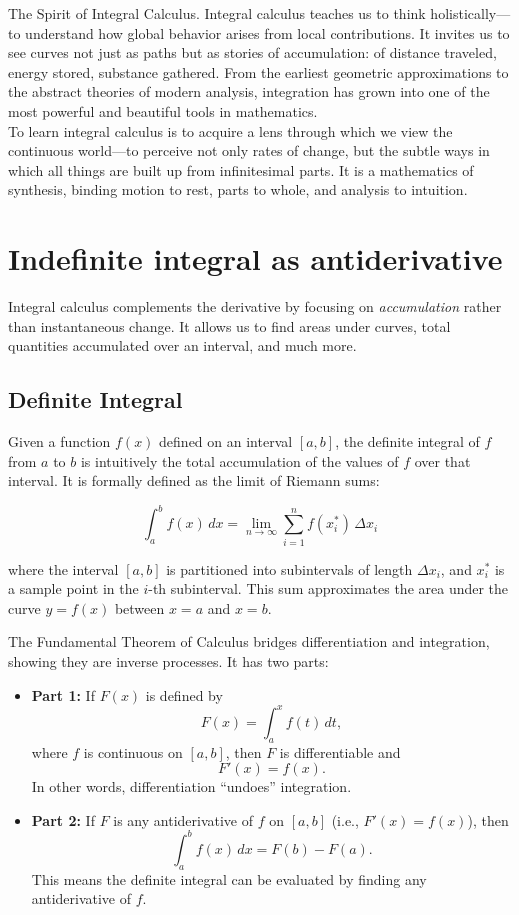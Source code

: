 \documentclass{book}
\begin{document}
The Spirit of Integral Calculus. Integral calculus teaches us to think holistically---to understand how global behavior arises from local contributions. It invites us to see curves not just as paths but as stories of accumulation: of distance traveled, energy stored, substance gathered. From the earliest geometric approximations to the abstract theories of modern analysis, integration has grown into one of the most powerful and beautiful tools in mathematics.\\

To learn integral calculus is to acquire a lens through which we view the continuous world---to perceive not only rates of change, but the subtle ways in which all things are built up from infinitesimal parts. It is a mathematics of synthesis, binding motion to rest, parts to whole, and analysis to intuition.

\section{Indefinite integral as antiderivative}

Integral calculus complements the derivative by focusing on \emph{accumulation} rather than instantaneous change. It allows us to find areas under curves, total quantities accumulated over an interval, and much more.

\subsection*{Definite Integral}

Given a function \( f(x) \) defined on an interval \([a, b]\), the definite integral of \( f \) from \( a \) to \( b \) is intuitively the total accumulation of the values of \( f \) over that interval. It is formally defined as the limit of Riemann sums:

\[
\int_a^b f(x) \, dx = \lim_{n \to \infty} \sum_{i=1}^n f(x_i^*) \, \Delta x_i
\]

where the interval \([a, b]\) is partitioned into subintervals of length \(\Delta x_i\), and \(x_i^*\) is a sample point in the \(i\)-th subinterval. This sum approximates the area under the curve \( y = f(x) \) between \( x = a \) and \( x = b \).

The Fundamental Theorem of Calculus bridges differentiation and integration, showing they are inverse processes. It has two parts:

\begin{itemize}
    \item \textbf{Part 1:} If \( F(x) \) is defined by
    \[
    F(x) = \int_a^x f(t) \, dt,
    \]
    where \( f \) is continuous on \([a,b]\), then \( F \) is differentiable and
    \[
    F'(x) = f(x).
    \]
    In other words, differentiation “undoes” integration.

    \item \textbf{Part 2:} If \( F \) is any antiderivative of \( f \) on \([a,b]\) (i.e., \( F'(x) = f(x) \)), then
    \[
    \int_a^b f(x) \, dx = F(b) - F(a).
    \]
    This means the definite integral can be evaluated by finding any antiderivative of \( f \).
\end{itemize}
\end{document}
